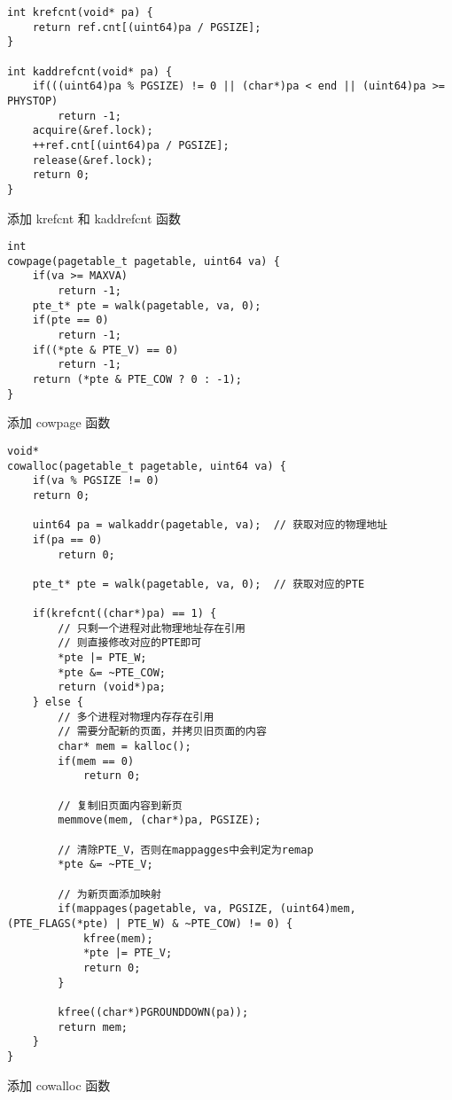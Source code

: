 \begin{listing}[!htb]
	\begin{verbatim}
int krefcnt(void* pa) {
    return ref.cnt[(uint64)pa / PGSIZE];
}

int kaddrefcnt(void* pa) {
    if(((uint64)pa % PGSIZE) != 0 || (char*)pa < end || (uint64)pa >= PHYSTOP)
        return -1;
    acquire(&ref.lock);
    ++ref.cnt[(uint64)pa / PGSIZE];
    release(&ref.lock);
    return 0;
}
	\end{verbatim}
	\caption{添加 krefcnt 和 kaddrefcnt 函数}\label{lst:krefcnt_and_kaddrefcnt}
\end{listing}

\begin{listing}[!htb]
	\begin{verbatim}
int 
cowpage(pagetable_t pagetable, uint64 va) {
    if(va >= MAXVA)
        return -1;
    pte_t* pte = walk(pagetable, va, 0);
    if(pte == 0)
        return -1;
    if((*pte & PTE_V) == 0)
        return -1;
    return (*pte & PTE_COW ? 0 : -1);
}
	\end{verbatim}
	\caption{添加 cowpage 函数}\label{lst:cowpage}
\end{listing}

\begin{listing}[!htb]
	\begin{verbatim}
void* 
cowalloc(pagetable_t pagetable, uint64 va) {
    if(va % PGSIZE != 0)
    return 0;
    
    uint64 pa = walkaddr(pagetable, va);  // 获取对应的物理地址
    if(pa == 0)
        return 0;

    pte_t* pte = walk(pagetable, va, 0);  // 获取对应的PTE
    
    if(krefcnt((char*)pa) == 1) {
        // 只剩一个进程对此物理地址存在引用
        // 则直接修改对应的PTE即可
        *pte |= PTE_W;
        *pte &= ~PTE_COW;
        return (void*)pa;
    } else {
        // 多个进程对物理内存存在引用
        // 需要分配新的页面，并拷贝旧页面的内容
        char* mem = kalloc();
        if(mem == 0)
            return 0;
        
        // 复制旧页面内容到新页
        memmove(mem, (char*)pa, PGSIZE);
        
        // 清除PTE_V，否则在mappagges中会判定为remap
        *pte &= ~PTE_V;
        
        // 为新页面添加映射
        if(mappages(pagetable, va, PGSIZE, (uint64)mem, (PTE_FLAGS(*pte) | PTE_W) & ~PTE_COW) != 0) {
            kfree(mem);
            *pte |= PTE_V;
            return 0;
        }
        
        kfree((char*)PGROUNDDOWN(pa));
        return mem;
    }
}
	\end{verbatim}
	\caption{添加 cowalloc 函数}\label{lst:cowalloc}
\end{listing}

